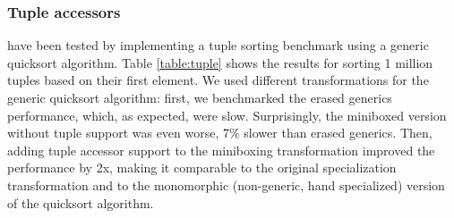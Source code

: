 \subsubsection{Tuple accessors} have been tested by implementing a tuple sorting benchmark using a generic quicksort algorithm. Table \ref{table:tuple} shows the results for sorting 1 million tuples based on their first element. We used different transformations for the generic quicksort algorithm: first, we benchmarked the erased generics performance, which, as expected, were slow. Surprisingly, the miniboxed version without tuple support was even worse, 7\% slower than erased generics. Then, adding tuple accessor support to the miniboxing transformation improved the performance by 2x, making it comparable to the original specialization transformation and to the monomorphic (non-generic, hand specialized) version of the quicksort algorithm.
